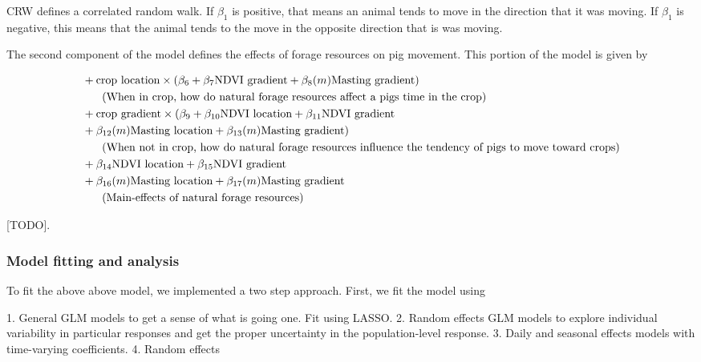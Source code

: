 \documentclass[a4paper]{article}
\begin{document}
 CRW defines a correlated random walk. If $\beta_1$ is positive, that means an animal tends to move in the direction that it was moving.  If $\beta_1$ is negative, this means that the animal tends to the move in the opposite direction that is was moving. 

 The second component of the model defines the effects of forage resources on pig movement. This portion of the model is given by

 \begin{align}
  & + \text{crop location} \times (\beta_6 + \beta_7 \text{NDVI gradient} + \beta_8(m) \text{Masting gradient)  } \\
  &\text{\hspace{0.5cm}  (When in crop, how do natural forage resources affect a pigs time in the crop)} \\
  & + \text{crop gradient} \times (\beta_9 + \beta_{10} \text{NDVI location} + \beta_{11} \text{NDVI gradient} \\ &+ \beta_{12}(m) \text{Masting location} + \beta_{13}(m) \text{Masting gradient)  } \\
  & \text{\hspace{0.5cm}  (When not in crop, how do natural forage resources influence the tendency of pigs to move toward crops)} \\
  & + \beta_{14} \text{NDVI location} + \beta_{15} \text{NDVI gradient} \\  &+ \beta_{16}(m) \text{Masting location} + \beta_{17}(m) \text{Masting gradient  } 
  \\ &\text{\hspace{0.5cm} (Main-effects of natural forage resources)}
\end{align}

[TODO]. 

\subsubsection*{Model fitting and analysis}

To fit the above above model, we implemented a two step approach. First, we fit the model using 

1. General GLM models to get a sense of what is going one. Fit using LASSO.
2. Random effects GLM models to explore individual variability in particular responses and get the proper uncertainty in the population-level response.
3. Daily and seasonal effects models with time-varying coefficients. 
4. Random effects 

\end{document}
